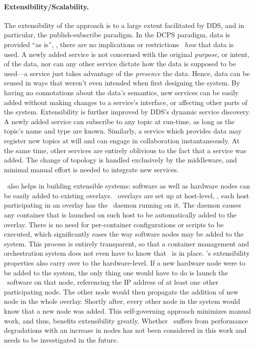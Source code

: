 \paragraph{Extensibility/Scalability.}
The extensibility of the approach is to a large extent facilitated by DDS, and in particular, the publish-subscribe paradigm. In the DCPS paradigm, data is provided ``as is'', \ie , there are no implications or restrictions \wrt\ \emph{how} that data is used. A newly added service is not concerned with the original \emph{purpose}, or intent, of the data, nor can any other service dictate how the data is supposed to be used---a service just takes advantage of the \emph{presence} the data. Hence, data can be reused in ways that weren't even intended when first designing the system. By having no connotations about the data's semantics, new services can be easily added without making changes to a service's interface, or affecting other parts of the system. Extensibility is further improved by DDS's dynamic service discovery. A newly added service can subscribe to any topic at run-time, as long as the topic's name and type are known. Similarly, a service which provides data may register new topics at will and can engage in collaboration instantaneously. At the same time, other services are entirely oblivious to the fact that a service was added. The change of topology is handled exclusively by the middleware, and minimal manual effort is needed to integrate new services.

\wnet\ also helps in building extensible systems: software as well as hardware nodes can be easily added to existing overlays. \weave\ overlays are set up at host-level, \ie , each host participating in an overlay has the \weave\ daemon running on it. The daemon causes any container that is launched on such host to be automatically added to the overlay. There is no need for per-container configurations or scripts to be executed, which significantly eases the way software nodes may be added to the system. This process is entirely transparent, so that a container management and orchestration system does not even have to know that \weave\ is in place. \weave 's extensibility properties also carry over to the hardware-level. If a new hardware node were to be added to the system, the only thing one would have to do is launch the \weave\ software on that node, referencing the IP address of at least one other participating node. The other node would then propagate the addition of new node in the whole overlay. Shortly after, every other node in the system would know that a new node was added. This self-governing approach minimizes manual work, and thus, benefits extensibility greatly. Whether \weave\ suffers from performance degradations with an increase in nodes has not been considered in this work and needs to be investigated in the future.

